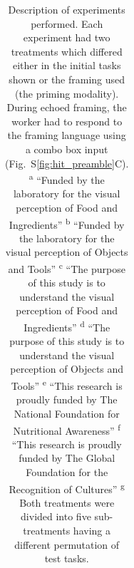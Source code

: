 \documentclass[12pt]{article}
\begin{document}
\begin{table}
\begin{tabular}{c c c c c c}
\bottomrule
\end{tabular}
\caption{
	Description of experiments performed.  Each experiment had two treatments
	which differed either in the initial tasks shown or the framing used 
	(the priming modality).  
	During echoed framing, the worker had to respond to the framing language
	using a combo box input (Fig.~S\ref{fig:hit_preamble}C).
	\newline\textsuperscript{a} ``Funded by the laboratory for the visual 
		perception of Food and Ingredients''
	\newline\textsuperscript{b} ``Funded by the laboratory for the visual 
		perception of Objects and Tools''
	\newline\textsuperscript{c} ``The purpose of this study is to understand the visual perception of Food and Ingredients''
	\newline\textsuperscript{d} ``The purpose of this study is to understand the visual perception of Objects and Tools''
	\newline\textsuperscript{e} ``This research is proudly funded by The National 
		Foundation for Nutritional Awareness''
	\newline\textsuperscript{f} ``This research is proudly funded by The Global 
		Foundation for the Recognition of Cultures''
	\newline\textsuperscript{g} Both treatments were divided into five 
	sub-treatments having a different permutation of test tasks.
}
\label{table:experiments}
\end{table}
\end{document}
